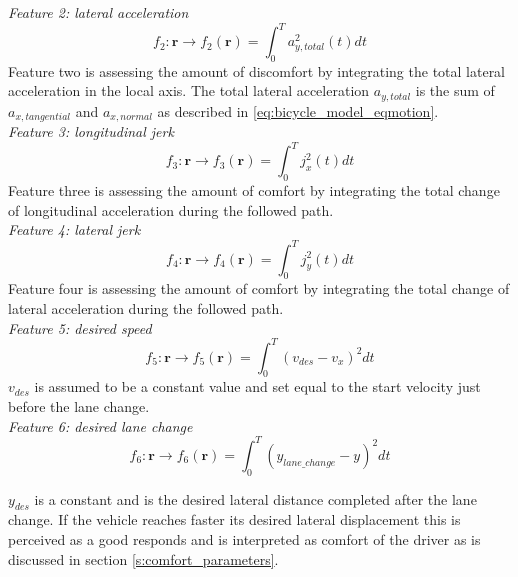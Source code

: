 \textit{Feature 2: lateral acceleration}
\begin{equation}\label{eq:flat_acc}
f_{2}:\bm{r}\xrightarrow{}f_2(\bm{r})=\int_{0}^{T}a_{y,total}^{2}(t) dt
\end{equation}
Feature two is assessing the amount of discomfort by integrating the total lateral acceleration in the local axis. The total lateral acceleration  $a_{y,total} $ is the sum of  $ a_{x,tangential}$ and $a_{x,normal}$ as described in \ref{eq:bicycle_model_eqmotion}.\\

\textit{Feature 3: longitudinal jerk}
\begin{equation}\label{eq:flong_jerk}
f_{3}:\bm{r}\xrightarrow{}f_3(\bm{r})=\int_{0}^{T}j_x^{2}(t) dt
\end{equation}
Feature three is assessing the amount of comfort by integrating the total change of longitudinal acceleration during the followed path. \\

\textit{Feature 4: lateral jerk}
\begin{equation}\label{eq:flat_jerk}
f_{4}:\bm{r}\xrightarrow{}f_4(\bm{r})=\int_{0}^{T}j_y^{2}(t) dt
\end{equation}
Feature four is assessing the amount of comfort by integrating the total change of lateral acceleration during the followed path. \\

\textit{Feature 5: desired speed}
\begin{equation}\label{eq:des_speed}
f_{5}:\bm{r}\xrightarrow{}f_5(\bm{r})=\int_{0}^{T}(v_{des}-v_x)^2 dt
\end{equation}
$v_{des}$ is assumed to be a constant value and set equal to the start velocity just before the lane change.\\

\textit{Feature 6: desired lane change}
\begin{equation}\label{eq:des_lane_change}
f_{6}:\bm{r}\xrightarrow{}f_6(\bm{r})=\int_{0}^{T}(y_{lane\_change}-y)^2 dt
\end{equation}

$y_{des}$ is a constant and is the desired lateral distance completed after the lane change. If the vehicle reaches faster its desired lateral displacement this is perceived as a good responds and is interpreted as comfort of the driver as is discussed in section \ref{s:comfort_parameters}.
\\


